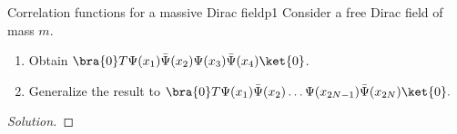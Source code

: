 \begin{problem}{Correlation functions for a massive Dirac field}{p1}
   Consider a free Dirac field of mass \(m\).
   \begin{enumerate}[label=(\alph*)]
      \item Obtain \(\bra{0}T \Psi(x_1) \bar{\Psi}(x_2) \Psi(x_3) \bar{\Psi}(x_4)\ket{0}\).
      \item Generalize the result to \(\bra{0} T \Psi(x_1) \bar{\Psi}(x_2) \dots \Psi(x_{2N - 1}) \bar{\Psi}(x_{2N})\ket{0}.\)
   \end{enumerate}
\end{problem}
\begin{proof}[Solution]
    
\end{proof}
